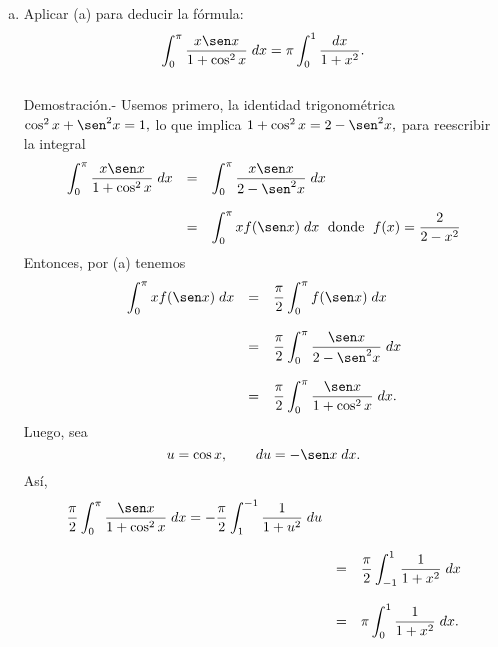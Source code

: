 \begin{enumerate}[\bfseries 1.]
\begin{enumerate}[(a)]
		\item Aplicar (a) para deducir la fórmula:
		$$\int_0^\pi \dfrac{x\sen x}{1+\cos^2 x}\; dx=\pi \int_0^1 \dfrac{dx}{1+x^2}.$$\\
		    Demostración.-\; Usemos primero, la identidad trigonométrica $\cos^2 x+\sen^2 x = 1,$ lo que implica $1+\cos^2x=2-\sen^2x,$ para reescribir la integral
		    $$\begin{array}{rcl}
			\displaystyle\int_0^\pi \dfrac{x\sen x}{1+\cos^2 x}\; dx &=& \displaystyle \int_0^\pi \dfrac{x\sen x}{2-\sen^2 x}\; dx\\\\
										 &=&\displaystyle\int_0^\pi xf(\sen x)\; dx \;\mbox{ donde }\; f(x)=\dfrac{2}{2-x^2}
		    \end{array}$$
		    Entonces, por (a) tenemos
		    $$\begin{array}{rcl}
			\displaystyle \int_0^\pi xf(\sen x)\; dx &=& \dfrac{\pi}{2} \displaystyle\int_0^\pi f(\sen x)\; dx\\\\
								 &=& \dfrac{\pi}{2} \displaystyle\int_0^\pi \dfrac{\sen x}{2-\sen^2 x}\; dx\\\\
								 &=& \dfrac{\pi}{2} \displaystyle\int_0^\pi \dfrac{\sen x}{1+\cos^2 x}\; dx.
		    \end{array}$$
		    Luego, sea
		    $$u=\cos x,\qquad du=-\sen x\; dx.$$
		    Así,
		    $$\begin{array}{rcl}
			\dfrac{\pi}{2}\displaystyle\int_0^\pi \dfrac{\sen x}{1+\cos^2 x}\; dx = -\dfrac{\pi}{2}\displaystyle\int_1^{-1}\dfrac{1}{1+u^2}\; du\\\\
			&=&\dfrac{\pi}{2}\displaystyle\int_{-1}^1 \dfrac{1}{1+x^2}\; dx\\\\
			&=&\pi \displaystyle\int_0^1 \dfrac{1}{1+x^2}\; dx.
		    \end{array}$$
	    \end{enumerate}


\end{enumerate}
